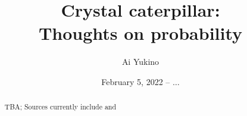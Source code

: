 \documentclass{article}
\begin{document}
\title{Crystal caterpillar:\\
	\large\color{subtitle} Thoughts on probability}
\author{Ai Yukino}
\date{February 5, 2022 -- $\dots$}
\maketitle
\hypersetup{linkcolor = internallinkcolor}
\tableofcontents
\hypersetup{linkcolor= .}

\begin{abstract}
	TBA; Sources currently include \cite{tao2009} and \cite{tao2015}
\end{abstract}



\end{document}

